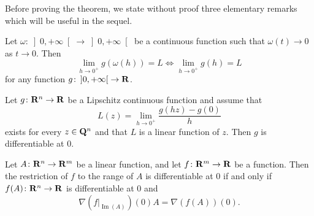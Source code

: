 Before proving the theorem, we state without proof three elementary
remarks which will be useful in the sequel.
\begin{rem}\label{r:omb}
Let $\omega\colon \left]0,+\infty\right[\to \left]0,+\infty\right[$
be a continuous function such that $\omega (t)\to 0$ as $t\to
0$. Then
\[\lim_{h\to 0^+}g(\omega(h))=L\Leftrightarrow\lim_{h\to
0^+}g(h)=L\]
for any function $g\colon \left]0,+\infty\right[\to \bold R$.
\end{rem}
\begin{rem}\label{r:dif}
Let $g \colon  \bold R^n\to \bold R$ be a Lipschitz
continuous function and assume that
\[L(z)=\lim_{h\to 0^+}\frac{g(hz)-g(0)}h\]
exists for every $z\in\bold Q^n$ and that $L$ is a linear function of $z$.
Then $g$ is differentiable at 0.
\end{rem}
\begin{rem}\label{r:dif0}
Let $A \colon  \bold R^n\to \bold R^m$ be a linear
function, and let $f \colon  \bold R^m\to \bold R$ be a function. Then
the restriction of $f$ to the range of $A$ is differentiable at 0 if and
only if $f(A)\colon \bold R^n\to \bold R$ is differentiable at 0 and
\[\nabla(f|_{\operatorname{Im}(A)})(0)A=\nabla (f(A))(0).\]
\end{rem}

